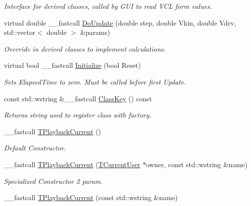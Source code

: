 \begin{DoxyCompactItemize}
\begin{DoxyCompactList}\small\item\em Interface for derived classes, called by G\+U\+I to read V\+C\+L form values. \end{DoxyCompactList}\item 
virtual double \+\_\+\+\_\+fastcall \hyperlink{class_t_playback_current_abc30d522f008c19b885a09390f298a94}{Do\+Update} (double step, double Vkin, double Vdrv, std\+::vector$<$ double $>$ \&params)
\begin{DoxyCompactList}\small\item\em Override in derived classes to implement calculations. \end{DoxyCompactList}\item 
virtual bool \+\_\+\+\_\+fastcall \hyperlink{class_t_playback_current_a547567293caf240658b64a6f89d55737}{Initialize} (bool Reset)
\begin{DoxyCompactList}\small\item\em Sets Elapsed\+Time to zero. Must be called before first Update. \end{DoxyCompactList}\item 
const std\+::wstring \&\+\_\+\+\_\+fastcall \hyperlink{class_t_playback_current_aabc05c6ace3f33105e3c0645785cc38a}{Class\+Key} () const 
\begin{DoxyCompactList}\small\item\em Returns string used to register class with factory. \end{DoxyCompactList}\item 
\hypertarget{class_t_playback_current_aeaac39223d617d49edcc464a85744433}{\+\_\+\+\_\+fastcall \hyperlink{class_t_playback_current_aeaac39223d617d49edcc464a85744433}{T\+Playback\+Current} ()}\label{class_t_playback_current_aeaac39223d617d49edcc464a85744433}

\begin{DoxyCompactList}\small\item\em Default Constructor. \end{DoxyCompactList}\item 
\hypertarget{class_t_playback_current_af57f23f36e61849c8037809b1d98397d}{\+\_\+\+\_\+fastcall \hyperlink{class_t_playback_current_af57f23f36e61849c8037809b1d98397d}{T\+Playback\+Current} (\hyperlink{class_t_current_user}{T\+Current\+User} $\ast$owner, const std\+::wstring \&name)}\label{class_t_playback_current_af57f23f36e61849c8037809b1d98397d}

\begin{DoxyCompactList}\small\item\em Specialized Constructor 2 param. \end{DoxyCompactList}\item 
\hypertarget{class_t_playback_current_ab47f87894a2ebd8bce3338858dca7367}{\+\_\+\+\_\+fastcall \hyperlink{class_t_playback_current_ab47f87894a2ebd8bce3338858dca7367}{T\+Playback\+Current} (const std\+::wstring \&name)}\label{class_t_playback_current_ab47f87894a2ebd8bce3338858dca7367}


\end{DoxyCompactItemize}
